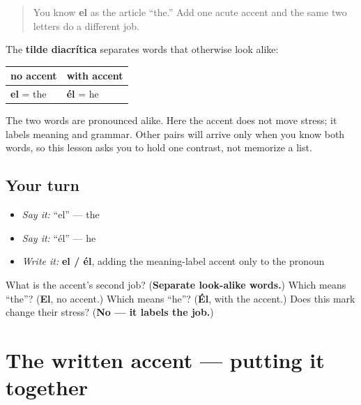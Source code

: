 \label{lesson:ES-W01-tilde-diacritica}



\begin{quote}
You know \textbf{el} as the article “the.” Add one acute accent and the same two letters do a different job.
\end{quote}

\begin{grammarlens}[title={Grammar Lens: one mark, two grammatical jobs}]
The \textbf{tilde diacrítica} separates words that otherwise look alike:

\noindent
\begin{tabularx}{\linewidth}{@{}>{\raggedright\arraybackslash}X>{\raggedright\arraybackslash}X@{}}
\toprule
\textbf{no accent} & \textbf{with accent} \\
\midrule
\textbf{el} = the & \textbf{él} = he \\
\bottomrule
\end{tabularx}

The two words are pronounced alike. Here the accent does not move stress; it labels meaning and grammar. Other pairs will arrive only when you know both words, so this lesson asks you to hold one contrast, not memorize a list.
\end{grammarlens}

\subsection*{Your turn}
\begin{itemize}
\raggedright
  \item \emph{Say it:} “el” — the
  \item \emph{Say it:} “él” — he
  \item \emph{Write it:} \textbf{el / él}, adding the meaning-label accent only to the pronoun
\end{itemize}

\begin{tcolorbox}[breakable,colback=teal!4,colframe=teal!35!black,title={Before you move on}]
What is the accent's second job? (\textbf{Separate look-alike words.}) Which means “the”? (\textbf{El}, no accent.) Which means “he”? (\textbf{Él}, with the accent.) Does this mark change their stress? (\textbf{No — it labels the job.})
\end{tcolorbox}
\section[Practice]{The written accent — putting it together}

